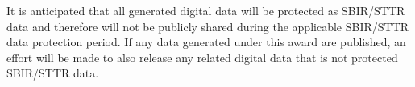 \documentclass[times,12pt,portrait]{article} %
\date{}
\begin{document}


It is anticipated that all generated digital data will be protected as SBIR/STTR data
and therefore will not be publicly shared during the applicable SBIR/STTR data protection 
period. If any data generated under this award are published, an effort will be made to 
also release any related digital data that is not protected SBIR/STTR data.
\end{document}
